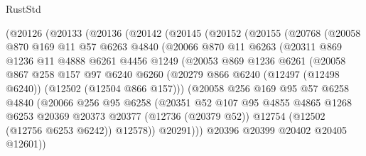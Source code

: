 \begin{lexlean}{RustStd}
\begin{coremodule}
    (@20126
      (@20133
        (@20136
          (@20142
            (@20145
              (@20152
                (@20155
                  (@20768
                    (@20058
                      @870
                      @169
                      @11
                      @57
                      @6263
                      @4840
                      (@20066
                        @870
                        @11
                        @6263
                        (@20311
                          @869
                          @1236
                          @11
                          @4888
                          @6261
                          @4456
                          @1249
                          (@20053
                            @869
                            @1236
                            @6261
                            (@20058
                              @867
                              @258
                              @157
                              @97
                              @6240
                              @6260
                              (@20279
                                @866
                                @6240
                                (@12497 (@12498 @6240))
                                (@12502 (@12504 @866 @157)))
                              (@20058
                                @256
                                @169
                                @95
                                @57
                                @6258
                                @4840
                                (@20066
                                  @256
                                  @95
                                  @6258
                                  (@20351
                                    @52
                                    @107
                                    @95
                                    @4855
                                    @4865
                                    @1268
                                    @6253
                                    @20369
                                    @20373
                                    @20377
                                    (@12736 (@20379 @52))
                                    @12754
                                    (@12502 (@12756 @6253 @6242))
                                    @12578))
                                @20291)))
                          @20396
                          @20399
                          @20402
                          @20405
                          @12601))

\end{coremodule}
\end{lexlean}
